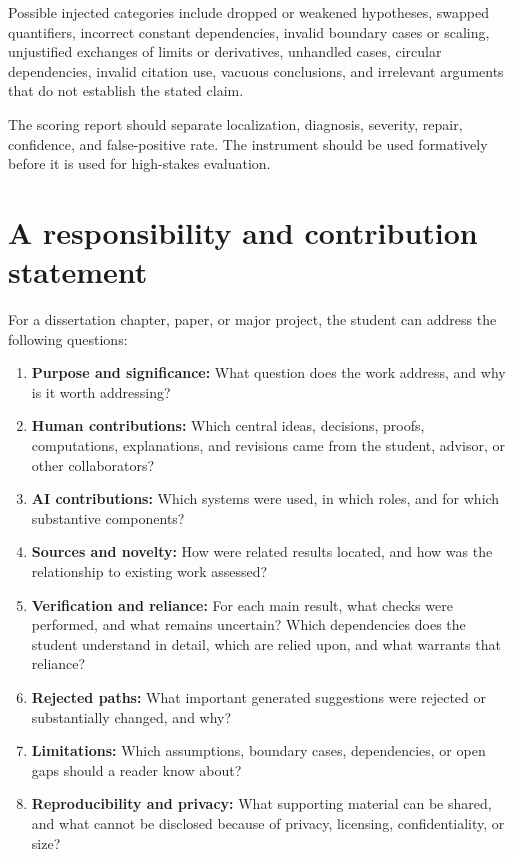 \documentclass[11pt]{article}
\begin{document}
Possible injected categories include dropped or weakened hypotheses, swapped quantifiers,
incorrect constant dependencies, invalid boundary cases or scaling, unjustified exchanges of
limits or derivatives, unhandled cases, circular dependencies, invalid citation use,
vacuous conclusions, and irrelevant arguments that do not establish the stated claim.

The scoring report should separate localization, diagnosis, severity, repair, confidence,
and false-positive rate.  The instrument should be used formatively before it is used for
high-stakes evaluation.

\section{A responsibility and contribution statement}

For a dissertation chapter, paper, or major project, the student can address the
following questions:

\begin{enumerate}
    \item \textbf{Purpose and significance:} What question does the work address, and why
    is it worth addressing?
    \item \textbf{Human contributions:} Which central ideas, decisions, proofs,
    computations, explanations, and revisions came from the student, advisor, or other
    collaborators?
    \item \textbf{AI contributions:} Which systems were used, in which roles, and for
    which substantive components?
    \item \textbf{Sources and novelty:} How were related results located, and how was the
    relationship to existing work assessed?
    \item \textbf{Verification and reliance:} For each main result, what checks were
    performed, and what remains uncertain? Which dependencies does the student
    understand in detail, which are relied upon, and what warrants that reliance?
    \item \textbf{Rejected paths:} What important generated suggestions were rejected or
    substantially changed, and why?
    \item \textbf{Limitations:} Which assumptions, boundary cases, dependencies, or open
    gaps should a reader know about?
    \item \textbf{Reproducibility and privacy:} What supporting material can be shared,
    and what cannot be disclosed because of privacy, licensing, confidentiality, or size?
\end{enumerate}
\end{document}
